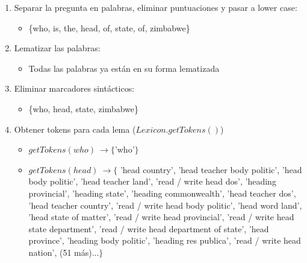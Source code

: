 \begin{enumerate}
  \item Separar la pregunta en palabras, eliminar puntuaciones y pasar a lower case:
  \begin{itemize}
    \item \{who, is, the, head, of, state, of, zimbabwe\}
  \end{itemize}
  \item Lematizar las palabras:
  \begin{itemize}
    \item Todas las palabras ya están en su forma lematizada
  \end{itemize}
  \item Eliminar marcadores sintácticos:
  \begin{itemize}
    \item \{who, head, state, zimbabwe\}
  \end{itemize}
  \item Obtener tokens para cada lema ($Lexicon.getTokens()$)
  \begin{itemize}
    \item $getTokens(who)\ \rightarrow \{$'who'$\}$
    \item $getTokens(head)\ \rightarrow \{$ 'head country', 'head teacher body politic', 'head body politic', 'head teacher land', 'read / write head dos', 'heading provincial', 'heading state', 'heading commonwealth', 'head teacher dos', 'head teacher country', 'read / write head body politic', 'head word land', 'head state of matter', 'read / write head provincial', 'read / write head state department', 'read / write head department of state', 'head province', 'heading body politic', 'heading res publica', 'read / write head nation', (51 más)...$\}$


\end{itemize}
\end{enumerate}
